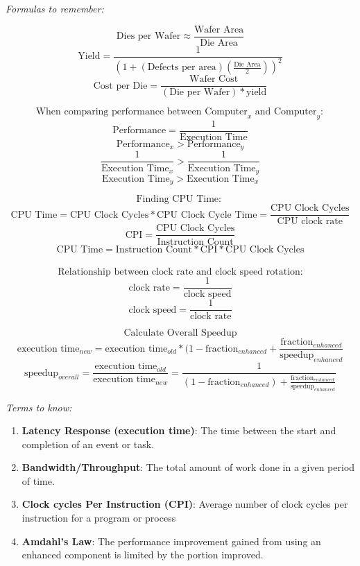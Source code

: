 \documentclass{book}
\begin{document}
	\noindent \emph{Formulas to remember: }\\
	\begin{center}
		$$\text{Dies per Wafer} \approx \frac{\text{Wafer Area}}{\text{Die Area}}$$
		$$\text{Yield} = \frac{1}{(1 + (\text{Defects per area})(\frac{\text{Die Area}}{2}))^2} $$
		$$\text{Cost per Die} = \frac{\text{Wafer Cost}}{(\text{Die per Wafer}) * \text{yield}}$$
		
		$$ \text{When comparing performance between } \text{Computer}_x \text{ and } \text{Computer}_y:$$
		$$ \text{Performance} = \frac{1}{\text{Execution Time}}$$
		$$ \text{Performance}_x > \text{Performance}_y $$
		$$ \frac{1}{\text{Execution Time}_x} >  \frac{1}{\text{Execution Time}_y}$$
		$$ \text{Execution Time}_y  > \text{Execution Time}_x $$

		$$ \text{Finding CPU Time: } $$
		$$ \text{CPU Time} = \text{CPU Clock Cycles} * \text{CPU Clock Cycle Time} = \frac{\text{CPU Clock Cycles}}{\text{CPU clock rate}} $$
		$$ \text{CPI} = \frac{\text{CPU Clock Cycles}}{\text{Instruction Count}} $$
		$$ \text{CPU Time} = \text{Instruction Count} * \text{CPI} * \text{CPU Clock Cycles} $$ \\

		$$ \text{Relationship between clock rate and clock speed rotation:} $$
		$$ \text{clock rate} = \frac{1}{\text{clock speed}} $$
		$$ \text{clock speed} = \frac{1}{\text{clock rate}} $$

		$$ \text{Calculate Overall Speedup} $$
		$$ \text{execution time}_{new} = \text{execution time}_{old} * (1 - \text{fraction}_{enhanced} + \frac{\text{fraction}_{enhanced}}{\text{speedup}_{enhanced}}$$
		$$ \text{speedup}_{overall} = \frac{\text{execution time}_{old}}{\text{execution time}_{new}} = \frac{1}{(1 - \text{fraction}_{enhanced}) + \frac{\text{fraction}_{enhanced}}{\text{speedup}_{enhanced}}}$$
	\end{center}

	\noindent\emph{Terms to know: }
	\begin{enumerate}
		\item \textbf{Latency Response (execution time)}: The time between the start and completion of an event or task.
		\item \textbf{Bandwidth/Throughput}: The total amount of work done in a given period of time.
		\item \textbf{Clock cycles Per Instruction (CPI)}: Average number of clock cycles per instruction for a program or process
		\item \textbf{Amdahl's Law}: The performance improvement gained from using an enhanced component is limited by the portion improved.
	\end{enumerate}
\end{document}
